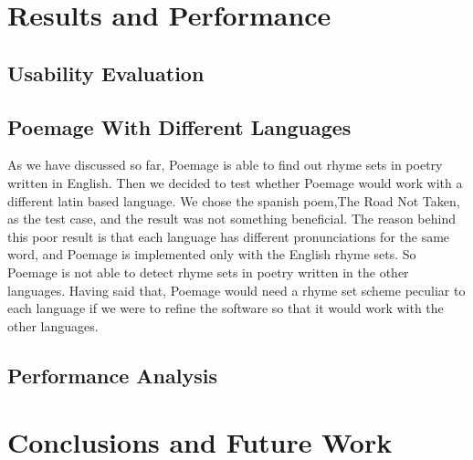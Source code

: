 \documentclass[journal]{vgtc}                %
\begin{document}
\section{Results and Performance} \label{results}
\subsection{Usability Evaluation}
\subsection{Poemage With Different Languages}
As we have discussed so far, Poemage is able to find out rhyme sets in poetry written in English.  Then we  decided to test whether Poemage would work with a different latin based language. We chose the spanish poem,The Road Not Taken, as the test case, and the result was not something beneficial. The reason behind this poor result is that each language has different pronunciations for the same word, and Poemage is implemented only with the English rhyme sets. So Poemage is not able to detect rhyme sets in poetry written in the other languages. Having said that, Poemage would need a rhyme set scheme peculiar to each language if we were to refine the software so that it would work with the other languages.

\subsection{Performance Analysis}

\section{Conclusions and Future Work} \label{conclusion}


\newpage
%

%
%
%


\end{document}

